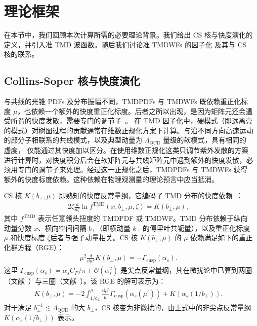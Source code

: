 \section{理论框架}
\label{sec:framework}

在本节中，我们回顾本次计算所需的必要理论背景。我们给出
CS 核与快度演化的定义，并引入准 TMD 波函数。随后我们讨论准 TMDWFs 的因子化
及其与 CS 核的联系。

\subsection{Collins-Soper 核与快度演化}


与共线的光锥 PDFs 及分布振幅不同，TMDPDFs 与 TMDWFs 既依赖重正化标度 $\mu$，也依赖一个额外的快度重正化标度。后者之所以出现，是因为矩阵元还会遭受所谓的快度发散，需要专门的调节子~\cite{Collins:1981uk,Becher:2010tm,Chiu:2011qc}。
在 TMD 因子化中，硬模式（即远离壳的模式）对树图过程的贡献通常在维数正规化方案下计算。与沿不同方向高速运动的部分子相联系的共线模式，以及典型动量为 $\Lambda_{\mathrm{QCD}}$ 量级的软模式，具有相同的虚度，
仅能通过其快度加以区分。在使用维数正规化这类只调节紫外发散的方案进行计算时，对快度积分后会在软矩阵元与共线矩阵元中遇到额外的快度发散，必须用专门的调节子来处理。经过这一正规化之后，TMDPDFs 与 TMDWFs 获得额外的快度标度依赖。这种依赖在物理观测量的理论预言中应当抵消。

CS 核 $K\left(b_{\perp}, \mu\right)$ 即熟知的快度反常量纲，它编码了 TMD 分布的快度依赖~\cite{Collins:1981va,Collins:1981uk}：
\begin{align}
	2 \zeta \frac{d}{d \zeta} \ln f^{\mathrm{TMD}}\left(x, b_{\perp}, \mu, \zeta\right)=K\left(b_{\perp}, \mu\right), \label{eq:TMDsrapidityevolution}
\end{align}
其中 $f^{\mathrm{TMD}}$ 表示任意领头扭度的 TMDPDF 或 TMDWF。TMD 分布依赖于纵向动量分数 $x$、横向空间间隔 $b_{\perp}$（即横动量 $k_{\perp}$ 的傅里叶共轭量），以及重正化标度 $\mu$ 和快度标度 $\zeta${后者与强子动量相关}。CS 核 $K\left(b_{\perp}, \mu\right)$ 的 $\mu$ 依赖满足如下的重正化群方程（RGE）：
\begin{align}
	\mu^{2} \frac{d}{d \mu^{2}} K\left(b_{\perp}, \mu\right)=-\Gamma_{\text {cusp}}\left(\alpha_{s}\right).  \label{eq:cuspanomalousdimension}
\end{align}
这里 $\Gamma_{\text {cusp}}\left(\alpha_{s}\right)=\alpha_sC_F/\pi+\mathcal{O}(\alpha_s^2)$ 是尖点反常量纲，其在微扰论中已算到两圈（文献~\cite{Li:2016ctv}）与三圈（文献~\cite{Moch:2017uml}）。该 RGE 的解可表示为：
\begin{align}
	K\left(b_{\perp}, \mu\right)=-2 \int_{1 / b_{\perp}}^{\mu} \frac{\mathrm{d} \mu^{\prime}}{\mu^{\prime}} \Gamma_{\text {cusp}}\left(\alpha_{s}\left(\mu^{\prime}\right)\right)+K\left(\alpha_{s}\left(1 / b_{\perp}\right)\right).
	\label{eq:nonper-per-CS-kernel}
\end{align}
对于满足 $b_{\perp}^{-1}\lesssim\Lambda_{\mathrm{QCD}}$ 的大 $b_{\perp}$，CS 核变为非微扰的，由上式中的非尖点反常量纲 $K\left(\alpha_{s}\left(1/b_{\perp}\right)\right)$ 表示。

